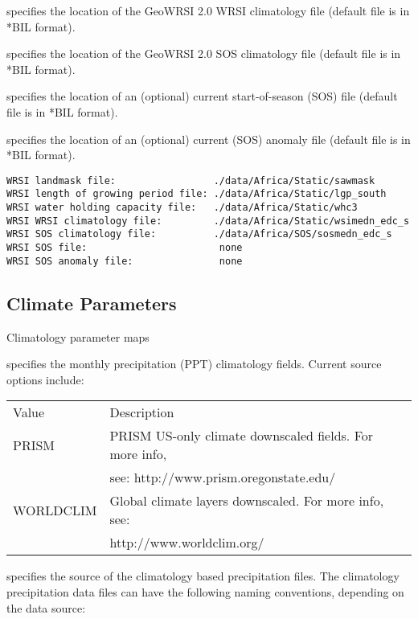   specifies the 
   location of the GeoWRSI 2.0 WRSI climatology file
   (default file is in *BIL format).

  specifies the 
   location of the GeoWRSI 2.0 SOS climatology file
   (default file is in *BIL format).

  specifies the 
   location of an (optional) current start-of-season (SOS) file
   (default file is in *BIL format).

  specifies the 
   location of an (optional) current (SOS) anomaly file
   (default file is in *BIL format).
 

 \begin{Verbatim}[frame=single]
WRSI landmask file:                 ./data/Africa/Static/sawmask
WRSI length of growing period file: ./data/Africa/Static/lgp_south
WRSI water holding capacity file:   ./data/Africa/Static/whc3
WRSI WRSI climatology file:         ./data/Africa/Static/wsimedn_edc_s
WRSI SOS climatology file:          ./data/Africa/SOS/sosmedn_edc_s
WRSI SOS file:                       none
WRSI SOS anomaly file:               none
 \end{Verbatim}

 
 \subsection{Climate Parameters} \label{ssec:climparams}
 

 
 Climatology parameter maps

  specifies the monthly
 precipitation (PPT) climatology fields.
 Current source options include:

 \begin{tabular}{ll}
 Value       & Description               \\
 PRISM       & PRISM US-only climate downscaled fields. For more info, \\
             &  see:  http://www.prism.oregonstate.edu/   \\
 WORLDCLIM   & Global climate layers downscaled.  For more info, see:  \\
             &  http://www.worldclim.org/ \\
 \end{tabular}

  specifies the source of the climatology
 based precipitation files.  The climatology precipitation data
 files can have the following naming conventions, depending
 on the data source: \\

